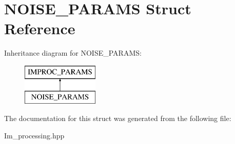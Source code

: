 \hypertarget{struct_n_o_i_s_e___p_a_r_a_m_s}{\section{N\+O\+I\+S\+E\+\_\+\+P\+A\+R\+A\+M\+S Struct Reference}
\label{struct_n_o_i_s_e___p_a_r_a_m_s}
}
Inheritance diagram for N\+O\+I\+S\+E\+\_\+\+P\+A\+R\+A\+M\+S\+:\begin{figure}[H]
\begin{center}
\leavevmode
\includegraphics[height=2.000000cm]{struct_n_o_i_s_e___p_a_r_a_m_s}
\end{center}
\end{figure}


The documentation for this struct was generated from the following file\+:\begin{DoxyCompactItemize}
\item 
Im\+\_\+processing.\+hpp\end{DoxyCompactItemize}
